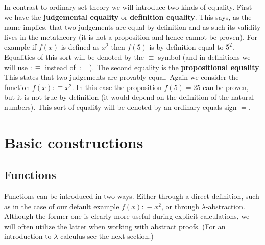     In contrast to ordinary set theory we will introduce two kinds of equality. First we have the \textbf{judgemental equality} or \textbf{definition equality}. This says, as the name implies, that two judgements are equal by definition and as such its validity lives in the metatheory (it is not a proposition and hence cannot be proven). For example if $f(x)$ is defined as $x^2$ then $f(5)$ is by definition equal to $5^2$. Equalities of this sort will be denoted by the $\equiv$ symbol (and in definitions we will use $:\equiv$ instead of $:=$). The second equality is the \textbf{propositional equality}. This states that two judgements are provably equal. Again we consider the function $f(x):\equiv x^2$. In this case the proposition $f(5)=25$ can be proven, but it is not true by definition (it would depend on the definition of the natural numbers). This sort of equality will be denoted by an ordinary equals sign $=$.

\section{Basic constructions}
\subsection{Functions}

    Functions can be introduced in two ways. Either through a direct definition, such as in the case of our default example $f(x):\equiv x^2$, or through $\lambda$-abstraction. Although the former one is clearly more useful during explicit calculations, we will often utilize the latter when working with abstract proofs. (For an introduction to $\lambda$-calculus see the next section.)


